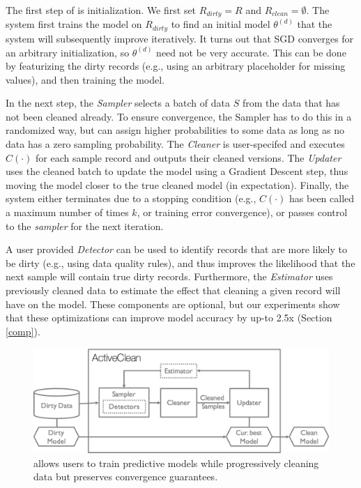 The first step of \sys is initialization. We first set $R_{dirty} = R$ and $R_{clean} = \emptyset$.
The system first trains the model on $R_{dirty}$ to find an initial model $\theta^{(d)}$ that the system will subsequently improve iteratively.
It turns out that SGD converges for an arbitrary initialization, so $\theta^{(d)}$ need not be very accurate. 
This can be done by featurizing the dirty records (e.g., using an arbitrary placeholder for missing values), and then training the model.

In the next step, the {\it Sampler} selects a batch of data $S$ from the data that has not been cleaned already. To ensure convergence, the Sampler has to do this in a randomized way, but can assign higher probabilities to some data as long as no data has a zero sampling probability.
The {\it Cleaner} is user-specifed and executes $C(\cdot)$ for each sample record and outputs their cleaned versions.
The {\it Updater} uses the cleaned batch to update the model using a Gradient Descent step, thus moving the model closer to the true cleaned model (in expectation).
Finally, the system either terminates due to a stopping condition (e.g., $C(\cdot)$ has been called a maximum number of times $k$, or training error convergence), or passes control to the {\it sampler} for the next iteration.

A user provided {\it Detector} can be used to identify records that are more likely to be dirty (e.g., using data quality rules), and thus improves the likelihood that the next sample will contain true dirty records. Furthermore, the {\it Estimator} uses previously cleaned data to estimate the effect that cleaning a given record will have on the model. These components are optional, but our experiments show that these optimizations can improve model accuracy by up-to 2.5x (Section \ref{comp}).

\begin{figure}[t]
\centering
 \includegraphics[width=\columnwidth]{figs/arch.png}
 \caption{\sysfull allows users to train predictive models while progressively cleaning data but preserves convergence guarantees. \label{sys-arch}}
\end{figure}

